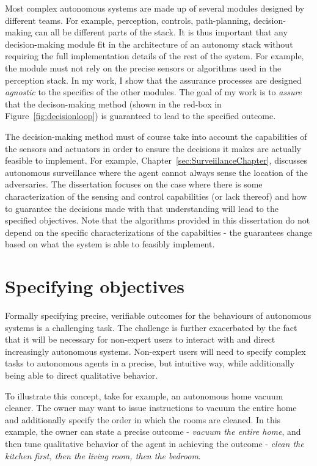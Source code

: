 Most complex autonomous systems are made up of several modules designed by different teams. For example, perception, controls, path-planning, decision-making can all be different parts of the stack. It is thus important that any decision-making module fit in the architecture of an autonomy stack without requiring the full implementation details of the rest of the system. For example, the module must not rely on the precise sensors or algorithms used in the perception stack. In my work, I show that the assurance processes are designed \emph{agnostic} to the specifics of the other modules. The goal of my work is to \emph{assure} that the decison-making method (shown in the red-box in Figure~\ref{fig:decisionloop}) is guaranteed to lead to the specified outcome.  

The decision-making method must of course take into account the capabilities of the sensors and actuators in order to ensure the decisions it makes are actually feasible to implement. For example, Chapter~\ref{sec:SurveiilanceChapter}, discusses autonomous surveillance where the agent cannot always sense the location of the adversaries. The dissertation focuses on the case where there is some characterization of the sensing and control capabilities (or lack thereof) and how to guarantee the decisions made with that understanding will lead to the specified objectives. Note that the algorithms provided in this dissertation do not depend on the specific characterizations of the capabilties - the guarantees change based on what the system is able to feasibly implement. 

\section{Specifying objectives}

Formally specifying precise, verifiable outcomes for the behaviours of autonomous systems is a challenging task. The challenge is further exacerbated by the fact that it will be necessary for non-expert users to interact with and direct increasingly autonomous systems. Non-expert users will need to specify complex tasks to autonomous agents in a precise, but intuitive way, while additionally being able to direct qualitative behavior. 

To illustrate this concept, take for example, an autonomous home vacuum cleaner. The owner may want to issue instructions to vacuum the entire home and additionally specify the order in which the rooms are cleaned. In this example, the owner can state a precise outcome - \emph{vacuum the entire home}, and then tune qualitative behavior of the agent in achieving the outcome - \emph{clean the kitchen first, then the living room, then the bedroom}. 

